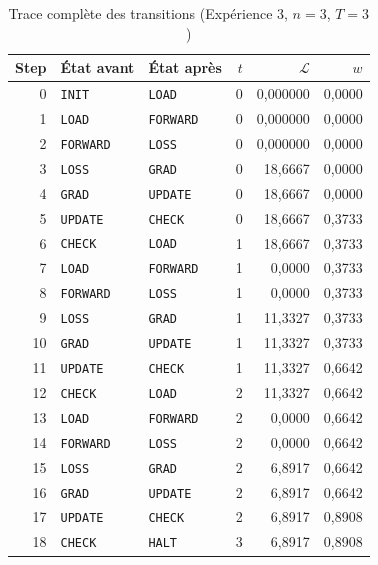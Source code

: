 \documentclass[12pt, a4paper, oneside]{report}
\newcommand{\state}[1]{\texttt{#1}}
\begin{document}
\begin{table}[H]
  \centering
  \caption{Trace complète des transitions (Expérience 3, $n=3$, $T=3$)}
  \label{tab:trace}
  \small
  \renewcommand{\arraystretch}{1.25}
  \begin{tabular}{r l l r r r}
    \toprule
    \textbf{Step} & \textbf{État avant} & \textbf{État après} & $t$ & $\mathcal{L}$ & $w$ \\
    \midrule
     0 & \state{INIT}    & \state{LOAD}    & 0 & 0{,}000000 & 0{,}0000 \\
     1 & \state{LOAD}    & \state{FORWARD} & 0 & 0{,}000000 & 0{,}0000 \\
     2 & \state{FORWARD} & \state{LOSS}    & 0 & 0{,}000000 & 0{,}0000 \\
     3 & \state{LOSS}    & \state{GRAD}    & 0 & 18{,}6667  & 0{,}0000 \\
     4 & \state{GRAD}    & \state{UPDATE}  & 0 & 18{,}6667  & 0{,}0000 \\
     5 & \state{UPDATE}  & \state{CHECK}   & 0 & 18{,}6667  & 0{,}3733 \\
     6 & \state{CHECK}   & \state{LOAD}    & 1 & 18{,}6667  & 0{,}3733 \\
     7 & \state{LOAD}    & \state{FORWARD} & 1 & 0{,}0000   & 0{,}3733 \\
     8 & \state{FORWARD} & \state{LOSS}    & 1 & 0{,}0000   & 0{,}3733 \\
     9 & \state{LOSS}    & \state{GRAD}    & 1 & 11{,}3327  & 0{,}3733 \\
    10 & \state{GRAD}    & \state{UPDATE}  & 1 & 11{,}3327  & 0{,}3733 \\
    11 & \state{UPDATE}  & \state{CHECK}   & 1 & 11{,}3327  & 0{,}6642 \\
    12 & \state{CHECK}   & \state{LOAD}    & 2 & 11{,}3327  & 0{,}6642 \\
    13 & \state{LOAD}    & \state{FORWARD} & 2 & 0{,}0000   & 0{,}6642 \\
    14 & \state{FORWARD} & \state{LOSS}    & 2 & 0{,}0000   & 0{,}6642 \\
    15 & \state{LOSS}    & \state{GRAD}    & 2 & 6{,}8917   & 0{,}6642 \\
    16 & \state{GRAD}    & \state{UPDATE}  & 2 & 6{,}8917   & 0{,}6642 \\
    17 & \state{UPDATE}  & \state{CHECK}   & 2 & 6{,}8917   & 0{,}8908 \\
    18 & \state{CHECK}   & \state{HALT}    & 3 & 6{,}8917   & 0{,}8908 \\
    \bottomrule
  \end{tabular}
\end{table}
\end{document}

